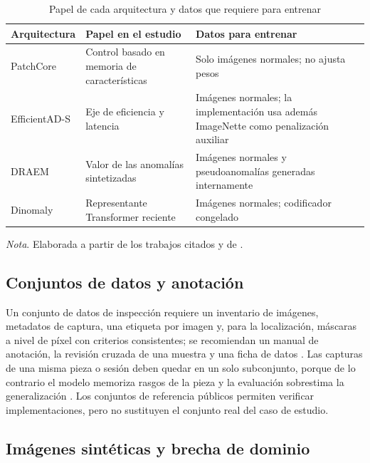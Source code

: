 \documentclass[12pt,oneside]{report}
\newcommand{\nota}[1]{\par\noindent\textit{Nota}. #1\par}
\begin{document}
\begin{table}[H]
\singlespacing\setlength{\parindent}{0pt}\setlength{\RaggedRightParindent}{0pt}
\caption{Papel de cada arquitectura y datos que requiere para entrenar}
\label{tab:roles}
\begin{tabularx}{\textwidth}{@{}>{\RaggedRight\arraybackslash}p{2.6cm}>{\RaggedRight\arraybackslash}X>{\RaggedRight\arraybackslash}X@{}}
\toprule
Arquitectura & Papel en el estudio & Datos para entrenar \\
\midrule
PatchCore \cite{roth2022} & Control basado en memoria de características & Solo imágenes normales; no ajusta pesos \\
EfficientAD-S \cite{batzner2024} & Eje de eficiencia y latencia & Imágenes normales; la implementación usa además ImageNette como penalización auxiliar \cite{akcay2022} \\
DRAEM \cite{zavrtanik2021} & Valor de las anomalías sintetizadas & Imágenes normales y pseudoanomalías generadas internamente \\
Dinomaly \cite{guo2025} & Representante Transformer reciente & Imágenes normales; codificador congelado \\
\bottomrule
\end{tabularx}
\nota{Elaborada a partir de los trabajos citados y de \cite{paez2026}.}
\end{table}

\subsection{Conjuntos de datos y anotación}

Un conjunto de datos de inspección requiere un inventario de imágenes, metadatos de captura, una etiqueta por imagen y, para la localización, máscaras a nivel de píxel con criterios consistentes; se recomiendan un manual de anotación, la revisión cruzada de una muestra y una ficha de datos \cite{gebru2021}. Las capturas de una misma pieza o sesión deben quedar en un solo subconjunto, porque de lo contrario el modelo memoriza rasgos de la pieza y la evaluación sobrestima la generalización \cite{kapoor2023}. Los conjuntos de referencia públicos permiten verificar implementaciones, pero no sustituyen el conjunto real del caso de estudio.

\subsection{Imágenes sintéticas y brecha de dominio}
\end{document}
